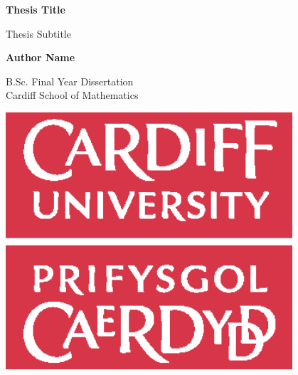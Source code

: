 \begin{titlepage}
    \begin{center}
        \vspace*{5cm}

        \textbf{Thesis Title}

        \vspace{0.5cm}
        Thesis Subtitle

        \vspace{1.5cm}

        \textbf{Author Name}

        \vfill

        B.Sc. Final Year Dissertation\\

        \vspace{0.5cm}
        Cardiff School of Mathematics

        \vspace{1.5cm}

        \includegraphics[width=0.8\textwidth]{../img/universitylogo.eps}


    \end{center}
\end{titlepage}
